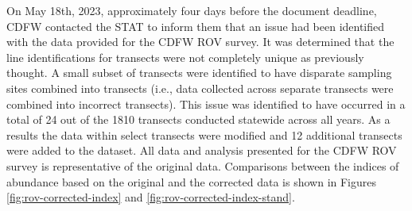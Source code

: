 \documentclass[11pt,
  english,
  letterpaper,
]{article}
\begin{document}
On May 18th, 2023, approximately four days before the document deadline, CDFW contacted the STAT to inform them that an issue had been identified with the data provided for the CDFW ROV survey. It was determined that the line identifications for transects were not completely unique as previously thought. A small subset of transects were identified to have disparate sampling sites combined into transects (i.e., data collected across separate transects were combined into incorrect transects). This issue was identified to have occurred in a total of 24 out of the 1810 transects conducted statewide across all years. As a results the data within select transects were modified and 12 additional transects were added to the dataset. All data and analysis presented for the CDFW ROV survey is representative of the original data. Comparisons between the indices of abundance based on the original and the corrected data is shown in Figures \ref{fig:rov-corrected-index} and \ref{fig:rov-corrected-index-stand}.

\newpage



\newpage

\begingroup\fontsize{7}{9}\selectfont
\end{document}
